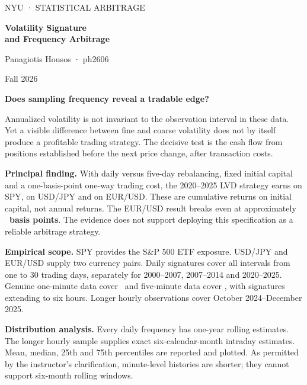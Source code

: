 \documentclass[11pt,letterpaper]{article}
\begin{document}
\thispagestyle{empty}
{\sffamily\color{teal}\large NYU · STATISTICAL ARBITRAGE\par}
\vspace{22pt}
{\sffamily\color{navy}\fontsize{33}{37}\selectfont\bfseries Volatility Signature\\and Frequency Arbitrage\par}
\vspace{12pt}
{\large Panagiotis Housos · ph2606\par}
{\color{muted}Fall 2026\par}
\vspace{16pt}
{\sffamily\large\bfseries Does sampling frequency reveal a tradable edge?\par}
Annualized volatility is not invariant to the observation interval in these data. Yet a visible difference between fine and coarse volatility does not by itself produce a profitable trading strategy. The decisive test is the cash flow from positions established before the next price change, after transaction costs.

\vspace{8pt}
\colorbox{pale}{\parbox{\dimexpr\linewidth-2\fboxsep\relax}{\vspace{7pt}
\textbf{Principal finding.} With daily versus five-day rebalancing, fixed initial capital and a one-basis-point one-way trading cost, the 2020–2025 LVD strategy earns \textbf{\SPYLVD} on SPY, \textbf{\USDJPYLVD} on USD/JPY and \textbf{\EURUSDLVD} on EUR/USD. These are cumulative returns on initial capital, not annual returns. The EUR/USD result breaks even at approximately \textbf{\EURBreakEven\ basis points}. The evidence does not support deploying this specification as a reliable arbitrage strategy.\vspace{7pt}}}

\vspace{14pt}
\textbf{Empirical scope.} SPY provides the S\&P 500 ETF exposure. USD/JPY and EUR/USD supply two currency pairs. Daily signatures cover all intervals from one to 30 trading days, separately for 2000–2007, 2007–2014 and 2020–2025. Genuine one-minute data cover \MinuteOneRange\ and five-minute data cover \MinuteFiveRange, with signatures extending to six hours. Longer hourly observations cover October 2024–December 2025.

\textbf{Distribution analysis.} Every daily frequency has one-year rolling estimates. The longer hourly sample supplies exact six-calendar-month intraday estimates. Mean, median, 25th and 75th percentiles are reported and plotted. As permitted by the instructor's clarification, minute-level histories are shorter; they cannot support six-month rolling windows.
\end{document}

